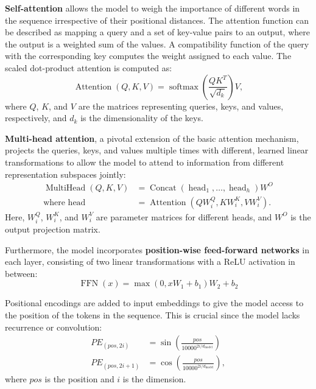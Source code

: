 \documentclass[conference]{IEEEtran}
\begin{document}
\textbf{Self-attention} allows the model to weigh the importance of different words in the sequence irrespective of their positional distances. The attention function can be described as mapping a query and a set of key-value pairs to an output, where the output is a weighted sum of the values. A compatibility function of the query with the corresponding key computes the weight assigned to each value. The scaled dot-product attention is computed as:
\[
\operatorname{Attention}(Q, K, V) = \operatorname{softmax}\left(\frac{QK^T}{\sqrt{d_k}}\right)V,
\]
where $Q$, $K$, and $V$ are the matrices representing queries, keys, and values, respectively, and $d_k$ is the dimensionality of the keys.

\textbf{Multi-head attention}, a pivotal extension of the basic attention mechanism, projects the queries, keys, and values multiple times with different, learned linear transformations to allow the model to attend to information from different representation subspaces jointly:
\[
\begin{aligned}
\operatorname{MultiHead}(Q, K, V) &= \operatorname{Concat}(\operatorname{head}_1, \ldots, \operatorname{head}_h) W^O \\
\text{where head} &= \operatorname{Attention}(QW_i^Q, KW_i^K, VW_i^V).
\end{aligned}
\]
Here, $W_i^Q$, $W_i^K$, and $W_i^V$ are parameter matrices for different heads, and $W^O$ is the output projection matrix.

Furthermore, the model incorporates \textbf{position-wise feed-forward networks} in each layer, consisting of two linear transformations with a ReLU \cite{agarap2019deep} activation in between:
\[
\operatorname{FFN}(x) = \max(0, xW_1 + b_1)W_2 + b_2
\]

Positional encodings are added to input embeddings to give the model access to the position of the tokens in the sequence. This is crucial since the model lacks recurrence or convolution:
\[
\begin{aligned}
PE_{(pos, 2i)} &= \sin\left(\frac{pos}{10000^{2i/d_{\text{model}}}}\right) \\
PE_{(pos, 2i+1)} &= \cos\left(\frac{pos}{10000^{2i/d_{\text{model}}}}\right),
\end{aligned}
\]
where $pos$ is the position and $i$ is the dimension.
\end{document}
